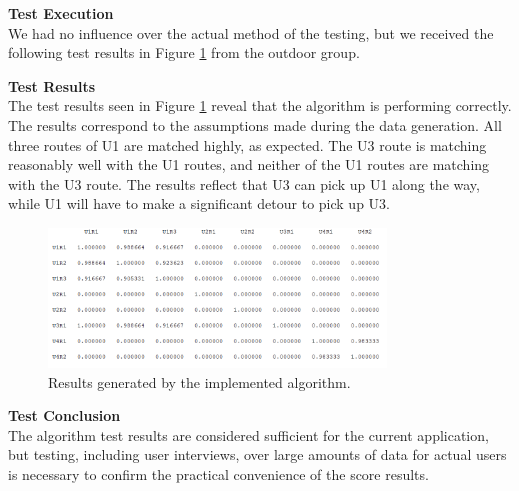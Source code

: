 \textbf{Test Execution}\\
We had no influence over the actual method of the testing, but we received the following test results in Figure \ref{fig:algresults} from the outdoor group.


\textbf{Test Results}\\
The test results seen in Figure \ref{fig:algresults} reveal that the algorithm is performing correctly.
The results correspond to the assumptions made during the data generation.
All three routes of U1 are matched highly, as expected.
The U3 route is matching reasonably well with the U1 routes, and neither of the U1 routes are matching with the U3 route.
The results reflect that U3 can pick up U1 along the way, while U1 will have to make a significant detour to pick up U3.

\begin{figure}[h]
	\centering
	\includegraphics[width=0.8\textwidth]{figures/newtestresultrs.png}
	\caption{Results generated by the implemented algorithm.}
	\label{fig:algresults}
\end{figure}


\textbf{Test Conclusion}\\
The algorithm test results are considered sufficient for the current application, but testing, including user interviews, over large amounts of data for actual users is necessary to confirm the practical convenience of the score results.